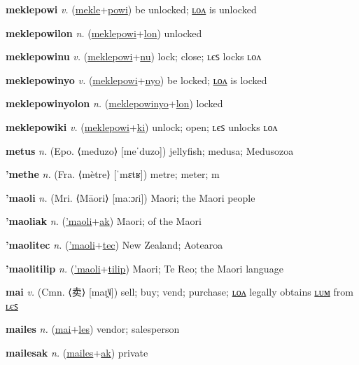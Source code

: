 \textbf{\hypertarget{meklepowi}{meklepowi}} \textit{v.} (\hyperlink{mekle}{mekle}+\allowbreak \hyperlink{powi}{powi})
be unlocked; \hyperlink{meklepowilon}{ʟᴏᴧ} is unlocked

\textbf{\hypertarget{meklepowilon}{meklepowilon}} \textit{n.} (\hyperlink{meklepowi}{meklepowi}+\allowbreak \hyperlink{lon}{lon})
unlocked

\textbf{\hypertarget{meklepowinu}{meklepowinu}} \textit{v.} (\hyperlink{meklepowi}{meklepowi}+\allowbreak \hyperlink{nu}{nu})
lock; close; ʟєꜱ locks ʟᴏᴧ

\textbf{\hypertarget{meklepowinyo}{meklepowinyo}} \textit{v.} (\hyperlink{meklepowi}{meklepowi}+\allowbreak \hyperlink{nyo}{nyo})
be locked; \hyperlink{meklepowinyolon}{ʟᴏᴧ} is locked

\textbf{\hypertarget{meklepowinyolon}{meklepowinyolon}} \textit{n.} (\hyperlink{meklepowinyo}{meklepowinyo}+\allowbreak \hyperlink{lon}{lon})
locked

\textbf{\hypertarget{meklepowiki}{meklepowiki}} \textit{v.} (\hyperlink{meklepowi}{meklepowi}+\allowbreak \hyperlink{ki}{ki})
unlock; open; ʟєꜱ unlocks ʟᴏᴧ

\textbf{\hypertarget{metus}{metus}} \textit{n.} (Epo. ⟨meduzo⟩ [meˈduzo])
jellyfish; medusa; Medusozoa

\textbf{\hypertarget{'methe}{'methe}} \textit{n.} (Fra. ⟨mètre⟩ [ˈmɛtʁ])
metre; meter; m

\textbf{\hypertarget{'maoli}{'maoli}} \textit{n.} (Mri. ⟨Māori⟩ [maːɔɾi])
Maori; the Maori people

\textbf{\hypertarget{'maoliak}{'maoliak}} \textit{n.} (\hyperlink{'maoli}{'maoli}+\allowbreak \hyperlink{ak}{ak})
Maori; of the Maori

\textbf{\hypertarget{'maolitec}{'maolitec}} \textit{n.} (\hyperlink{'maoli}{'maoli}+\allowbreak \hyperlink{tec}{tec})
New Zealand; Aotearoa

\textbf{\hypertarget{'maolitilip}{'maolitilip}} \textit{n.} (\hyperlink{'maoli}{'maoli}+\allowbreak \hyperlink{tilip}{tilip})
Maori; Te Reo; the Maori language

\textbf{\hypertarget{mai}{mai}} \textit{v.} (Cmn. ⟨{\chinese{}卖}⟩ [maɪ̯˥˩])
sell; buy; vend; purchase; \hyperlink{mailon}{ʟᴏᴧ} legally obtains \hyperlink{mailum}{ʟᴜᴍ} from \hyperlink{mailes}{ʟєꜱ}

\textbf{\hypertarget{mailes}{mailes}} \textit{n.} (\hyperlink{mai}{mai}+\allowbreak \hyperlink{les}{les})
vendor; salesperson

\textbf{\hypertarget{mailesak}{mailesak}} \textit{n.} (\hyperlink{mailes}{mailes}+\allowbreak \hyperlink{ak}{ak})
private

